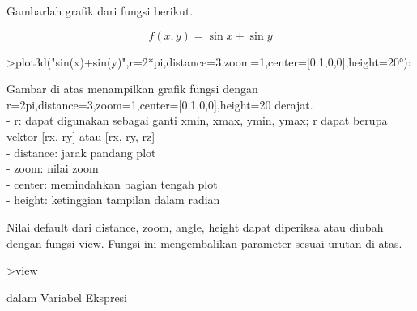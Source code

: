 \documentclass[12pt,arial,letterpaper]{book}
\begin{document}
\begin{eulercomment}
\begin{eulercomment}
\begin{eulercomment}
\begin{eulercomment}
\begin{eulercomment}
\begin{eulercomment}
\begin{eulercomment}
\begin{eulercomment}
\begin{eulercomment}
\begin{eulercomment}
\begin{eulercomment}
\begin{eulercomment}
\begin{eulercomment}
\begin{eulercomment}
\begin{eulercomment}
\begin{eulercomment}
\begin{eulercomment}
\begin{eulercomment}
\begin{eulercomment}
\end{eulercomment}
\begin{eulercomment}
Gambarlah grafik dari fungsi berikut.\\
\end{eulercomment}
\begin{eulerformula}
\[
f(x,y)=\sin{x}+\sin{y}
\]
\end{eulerformula}
\begin{eulerprompt}
>plot3d("sin(x)+sin(y)",r=2*pi,distance=3,zoom=1,center=[0.1,0,0],height=20°):
\end{eulerprompt}
\begin{eulercomment}
Gambar di atas menampilkan grafik fungsi dengan
r=2pi,distance=3,zoom=1,center=[0.1,0,0],height=20 derajat.\\
- r: dapat digunakan sebagai ganti xmin, xmax, ymin, ymax; r dapat
berupa vektor   [rx, ry] atau [rx, ry, rz]\\
- distance: jarak pandang plot\\
- zoom: nilai zoom\\
- center: memindahkan bagian tengah plot\\
- height: ketinggian tampilan dalam radian

Nilai default dari distance, zoom, angle, height dapat diperiksa atau
diubah dengan fungsi view. Fungsi ini mengembalikan parameter sesuai
urutan di atas.
\end{eulercomment}
\begin{eulerprompt}
>view
\end{eulerprompt}
\begin{euleroutput}
  [5,  2.6,  2,  0.4]
\end{euleroutput}
\begin{eulercomment}
\end{eulercomment}
\begin{eulercomment}
dalam Variabel Ekspresi


\end{eulercomment}
\end{eulercomment}
\end{eulercomment}
\end{eulercomment}
\end{eulercomment}
\end{eulercomment}
\end{eulercomment}
\end{eulercomment}
\end{eulercomment}
\end{eulercomment}
\end{eulercomment}
\end{eulercomment}
\end{eulercomment}
\end{eulercomment}
\end{eulercomment}
\end{eulercomment}
\end{eulercomment}
\end{eulercomment}
\end{eulercomment}
\end{document}
